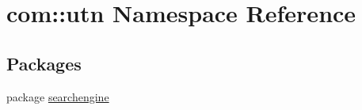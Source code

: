 \hypertarget{namespacecom_1_1utn}{\section{com\-:\-:utn \-Namespace \-Reference}
\label{namespacecom_1_1utn}
}
\subsection*{\-Packages}
\begin{DoxyCompactItemize}
\item 
package \hyperlink{namespacecom_1_1utn_1_1searchengine}{searchengine}
\end{DoxyCompactItemize}
